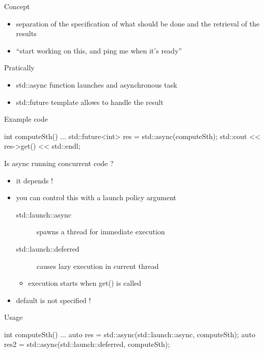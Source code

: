 \begin{frame}[fragile]
  \begin{block}{Concept}
    \begin{itemize}
    \item separation of the specification of what should be done and the retrieval of the results
    \item ``start working on this, and ping me when it's ready''
    \end{itemize}
  \end{block}
  \pause
  \begin{block}{Pratically}
    \begin{itemize}
    \item std::async function launches and asynchronous task
    \item std::future template allows to handle the result
    \end{itemize}
  \end{block}
  \pause
  \begin{exampleblock}{Example code}
    \begin{cppcode*}{}
      int computeSth() {...}
      std::future<int> res = std::async(computeSth);
      std::cout << res->get() << std::endl;
    \end{cppcode*}
  \end{exampleblock}
\end{frame}

\begin{frame}[fragile]
  \begin{block}{Is async running concurrent code ?}
    \begin{itemize}
    \item it depends !
    \item you can control this with a launch policy argument
      \begin{description}
      \item[std::launch::async] spawns a thread for immediate execution
      \item[std::launch::deferred] causes lazy execution in current thread
      \end{description}
      \begin{itemize}
      \item execution starts when get() is called
      \end{itemize}
    \item default is not specified !
    \end{itemize}
  \end{block}
  \pause
  \begin{exampleblock}{Usage}
    \begin{cppcode*}{}
      int computeSth() {...}
      auto res = std::async(std::launch::async,
                            computeSth);
      auto res2 = std::async(std::launch::deferred,
                             computeSth);
    \end{cppcode*}
  \end{exampleblock}
\end{frame}

